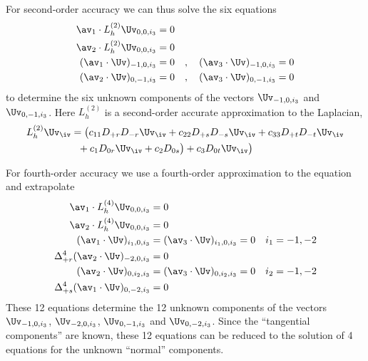 For second-order accuracy we can thus solve the six equations 
\begin{align*}
  \av_1\cdot L_h^{(2)} \Uv_{0,0,i_3} &= 0 \\
  \av_2\cdot L_h^{(2)} \Uv_{0,0,i_3} &=0 \\
  (\av_1\cdot\Uv)_{-1,0,i_3} &= 0 \quad,\quad (\av_3\cdot\Uv)_{-1,0,i_3} = 0 \\
  (\av_2\cdot\Uv)_{0,-1,i_3} &= 0 \quad,\quad (\av_3\cdot\Uv)_{0,-1,i_3} = 0 
\end{align*}
to determine the six unknown components of the vectors $\Uv_{-1,0,i_3}$ and $\Uv_{0,-1,i_3}$.
Here $L_h^{(2)}$ is a second-order accurate approximation to the Laplacian,
\begin{align*}
  L_h^{(2)} \Uv_\iv &= \big(c_{11} D_{+r}D_{-r} \Uv_\iv + c_{22} D_{+s}D_{-s} \Uv_\iv + c_{33} D_{+t}D_{-t} \Uv_\iv \\
          &~~ + c_{1} D_{0r} \Uv_\iv + c_{2} D_{0s}\big) + c_{3} D_{0t}\Uv_\iv \big) 
\end{align*}

For fourth-order accuracy we use a fourth-order approximation to the equation and extrapolate 
\begin{align*}
  \av_1\cdot L_h^{(4)} \Uv_{0,0,i_3} &=0 \\
  \av_2\cdot L_h^{(4)} \Uv_{0,0,i_3} &=0 \\
  (\av_1\cdot\Uv)_{i_1,0,i_3} &= (\av_3\cdot\Uv)_{i_1,0,i_3} = 0 \quad i_1=-1,-2\\
  \Delta_{+r}^4(\av_2\cdot\Uv)_{-2,0,i_3} &= 0  \\
  (\av_2\cdot\Uv)_{0,i_2,i_3} &= (\av_3\cdot\Uv)_{0,i_2,i_3} = 0  \quad i_2=-1,-2\\
  \Delta_{+s}^4(\av_1\cdot\Uv)_{0,-2,i_3} &= 0  \\
\end{align*}
These 12 equations determine the 12 unknown components of the 
vectors $\Uv_{-1,0,i_3}$, $\Uv_{-2,0,i_3}$, $\Uv_{0,-1,i_3}$ and $\Uv_{0,-2,i_3}$.
Since the ``tangential components'' are known, these 12 equations can be reduced to
the solution of 4 equations for the unknown ``normal'' components.


\clearpage
